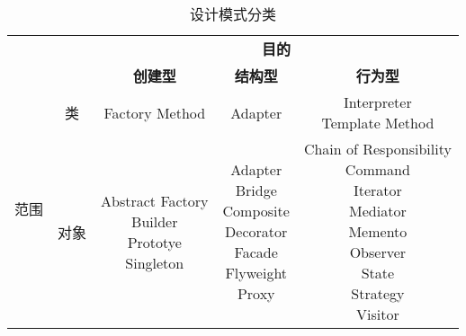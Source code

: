 \begin{table}[H]
    \centering
    \caption{设计模式分类}
    \label{table:设计模式分类}
    \setlength{\tabcolsep}{4mm}
    \begin{tabular}{c|c|c|c|c}
        \toprule
        & & \multicolumn{3}{c}{\textbf{目的}} \\
        \cline{3-5}
        & & \textbf{创建型} & \textbf{结构型} & \textbf{行为型} \\
        \midrule
        \multirow{2}{*}{范围} & 类 & Factory Method & Adapter & \makecell{Interpreter \\ Template Method} \\
        \cline{2-5}
        & 对象 & \makecell{Abstract Factory \\ Builder \\ Prototye \\ Singleton} & \makecell{Adapter \\ Bridge \\ Composite \\ Decorator \\ Facade \\ Flyweight \\ Proxy} & \makecell{Chain of Responsibility \\ Command \\ Iterator \\ Mediator \\ Memento \\ Observer \\ State \\ Strategy \\ Visitor} \\
        \bottomrule
    \end{tabular}
\end{table}

